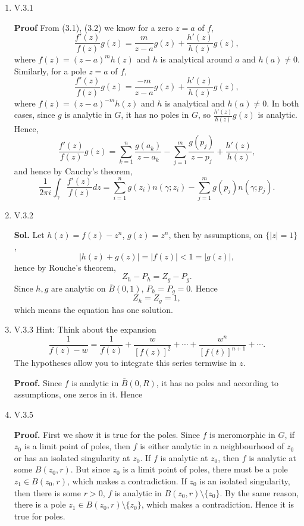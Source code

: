 \documentclass{article}%
\begin{document}
\begin{enumerate}


\item V.3.1

\textbf{Proof}
From (3.1), (3.2) we know for a zero $z = a$ of $f$,
$$
\frac{f'(z)}{f(z)}g(z) = \frac{m}{z-a}g(z) + \frac{h'(z)}{h(z)}g(z),
$$
where $f(z) = (z-a)^mh(z) $ and $h$ is analytical around $a$ and $h(a)\ne 0$. Similarly, for a pole $z = a$ of $f$,
$$
\frac{f'(z)}{f(z)}g(z) = \frac{-m}{z-a}g(z)+\frac{h'(z)}{h(z)}g(z),
$$
where $f(z) = (z-a)^{-m}h(z)$ and $h$ is analytical and $h(a)\ne 0$. In both cases, since $g$ is analytic in $G$, it has no poles in $G$, so $\frac{h'(z)}{h(z)}g(z)$ is analytic. Hence, 
$$
\frac{f'(z)}{f(z)}g(z) = \sum_{k=1}^{n}\frac{g(a_k)}{z-a_k} -\sum_{j = 1}^{m}\frac{g(p_j)}{z-p_j}+\frac{h'(z)}{h(z)},
$$
and hence by Cauchy's theorem,
$$
\frac{1}{2\pi i}\int_{\gamma}\frac{f'(z)}{f(z)}dz = \sum_{i=1}^{n}g(z_i)n(\gamma; z_i)-\sum_{j=1}^{m}g(p_j)n(\gamma; p_j).
$$


\item V.3.2

\textbf{Sol.} Let $h(z) = f(z) - z^n $, $g(z) = z^n $, then by assumptions, on $\{|z| = 1\}$,
$$
|h(z)+g(z)| = |f(z)| < 1 = |g(z)|,
$$
hence by Rouche's theorem,
$$
Z_h-P_h = Z_g-P_g.
$$
Since $h, g$ are analytic on $\bar{B}(0, 1)$, $P_h = P_g = 0 $. Hence
$$
Z_h = Z_g = 1,
$$
which means the equation has one solution.


\item V.3.3 Hint: Think about the expansion\[
 \frac{1}{f(z)-w} = \frac{1}{f(z)} + \frac{w}{[f(z)]^2} + \cdots + \frac{w^n}{[f(t)]^{n+1}}+\cdots .                                       
                                       \]The hypotheses allow you to integrate this series termwise in $z$.

\textbf{Proof.} Since $f$ is analytic in $\bar{B}(0, R)$, it has no poles and according to assumptions, one zeros in it. Hence



\item V.3.5

\textbf{Proof.}
First we show it is true for the poles. Since $f$ is meromorphic in $G$, if $z_0 $ is a limit point of poles, then $f$ is either analytic in a neighbourhood of $z_0 $ or has an isolated singularity at $z_0 $. If $f$ is analytic at $z_0 $, then $f$ is analytic at some $B(z_0, r)$. But since $z_0 $ is a limit point of poles, there must be a pole $z_1\in B(z_0, r)$, which makes a contradiction. If $z_0 $ is an isolated singularity, then there is some $r > 0$, $f$ is analytic in $B(z_0, r)\setminus\{z_0\}$. By the same reason, there is a pole $z_1\in B(z_0, r)\setminus\{z_0\}$, which makes a contradiction. Hence it is true for poles.


\end{enumerate}
\end{document}
